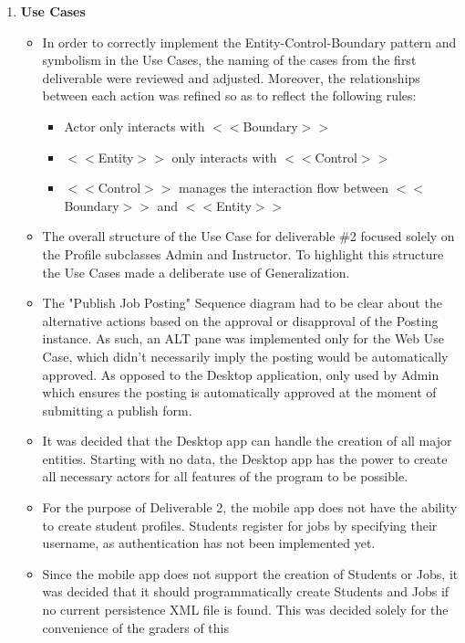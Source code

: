 \documentclass[12pt]{article}
\begin{document}
\begin{enumerate}
    \item \textbf{Use Cases}
    \begin{itemize}
        \item In order to correctly implement the Entity-Control-Boundary pattern and symbolism in the Use Cases, the naming of the cases from the first deliverable were reviewed and adjusted. Moreover, the relationships between each action was refined so as to reflect the following rules:
        \begin{itemize}
            \item Actor only interacts with $<<$Boundary$>>$
            \item $<<$Entity$>>$ only interacts with $<<$Control$>>$
            \item $<<$Control$>>$ manages the interaction flow between $<<$Boundary$>>$ and $<<$Entity$>>$
        \end{itemize}
        \item The overall structure of the Use Case for deliverable \#2 focused solely on the Profile subclasses Admin and Instructor. To highlight this structure the Use Cases made a deliberate use of Generalization.
        \item The "Publish Job Posting" Sequence diagram had to be clear about the alternative actions based on the approval or disapproval of the Posting instance. As such, an ALT pane was implemented only for the Web Use Case, which didn't necessarily imply the posting would be automatically approved. As opposed to the Desktop application, only used by Admin which ensures the posting is automatically approved at the moment of submitting a publish form.
        \item It was decided that the Desktop app can handle the creation of all major entities.
            Starting with no data, the Desktop app has the power to create all necessary actors for
            all features of the program to be possible.
        \item For the purpose of Deliverable 2, the mobile app does not have the ability to create
            student profiles. Students register for jobs by specifying their username, as
            authentication has not been implemented yet.
        \item Since the mobile app does not support the creation of Students or Jobs, it was decided
            that it should programmatically create Students and Jobs if no current persistence XML
            file is found. This was decided solely for the convenience of the graders of this

\end{itemize}
\end{enumerate}
\end{document}
